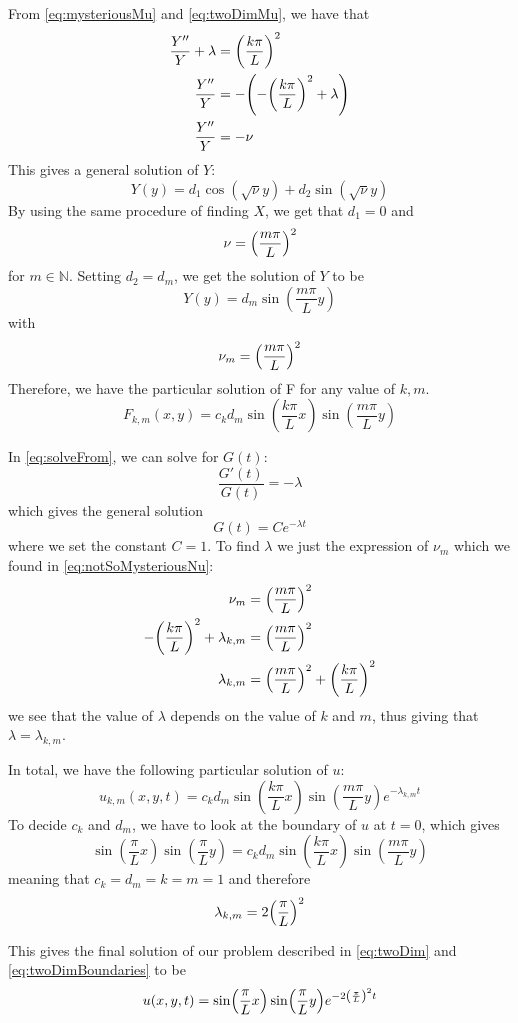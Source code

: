 From \vref{eq:mysteriousMu} and \vref{eq:twoDimMu}, we have that
\begin{align*}
\frac{Y''}{Y} +\lambda  &=\qty(\frac{k\pi}{L})^2 \\
\frac{Y''}{Y}&=-\qty(-\qty(\frac{k\pi}{L})^2 + \lambda ) \\
\frac{Y''}{Y}&=-\nu
\end{align*}
This gives a general solution of \(Y\):
\[
Y(y) = d_1\cos(\sqrt{\nu}y) + d_2\sin(\sqrt{\nu}y)
\]
By using the same procedure of finding \(X\), we get that \(d_1 = 0\) and
\[
\nu = \qty(\frac{m\pi}{L})^2
\]
for \(m \in \mathbb{N}\). Setting \(d_2 = d_m\), we get the solution of \(Y\) to be
\[
Y(y) = d_m\sin(\frac{m\pi}{L}y)
\]
with
\begin{equation}\label{eq:notSoMysteriousNu}
\nu_m = \qty(\frac{m\pi}{L})^2
\end{equation}
Therefore, we have the particular solution of F for any value of \(k,m\).
\[
F_{k,m}(x,y) = c_kd_m\sin(\frac{k\pi}{L}x)\sin(\frac{m\pi}{L}y)
\]

In \vref{eq:solveFrom}, we can solve for \(G(t)\):
\[
\frac{G'(t)}{G(t)}  = -\lambda
\]
which gives the general solution
\[
G(t) = Ce^{-\lambda t}
\]
where we set the constant \(C = 1\). To find \(\lambda\) we just the expression of \(\nu_m\) which we found in \vref{eq:notSoMysteriousNu}:
\begin{align*}
\nu_m &= \qty(\frac{m\pi}{L})^2 \\
-\qty(\frac{k\pi}{L})^2 + \lambda_{k,m} &= \qty(\frac{m\pi}{L})^2  \\
\lambda_{k,m} &= \qty(\frac{m\pi}{L})^2+\qty(\frac{k\pi}{L})^2
\end{align*}
we see that the value of \(\lambda \) depends on the value of \(k\) and \(m\), thus giving that \(\lambda = \lambda_{k,m}\).

In total, we have the following particular solution of \(u\):
\[
u_{k,m}(x,y,t) =  c_kd_m\sin(\frac{k\pi}{L}x)\sin(\frac{m\pi}{L}y)e^{-\lambda_{k,m} t}
\]
To decide \(c_k\) and \(d_m\), we have to look at the boundary of \(u\) at \(t = 0\), which gives
\[
\sin(\frac{\pi}{L}x)\sin(\frac{\pi}{L}y) =  c_kd_m\sin(\frac{k\pi}{L}x)\sin(\frac{m\pi}{L}y)
\]
meaning that \(c_k = d_m = k = m = 1\) and therefore
\[
\lambda_{k,m} = 2\qty(\frac{\pi}{L})^2
\]

This gives the final solution of our problem described in \vref{eq:twoDim} and \vref{eq:twoDimBoundaries} to be
\[
u(x,y,t) = \sin(\frac{\pi}{L}x)\sin(\frac{\pi}{L}y)e^{-2\qty(\frac{\pi}{L})^2 t}
\]
